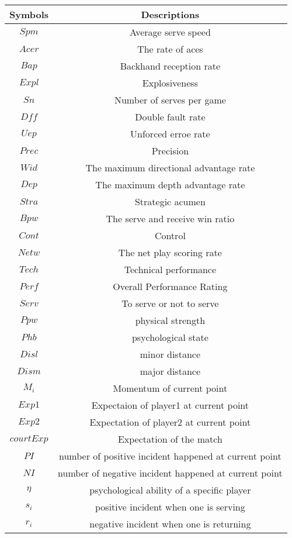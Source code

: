 \documentclass{article}
\begin{document}
\begin{table}[!]
    \centering
    \begin{tabular}{cc}
        \toprule
        Symbols & Descriptions\\
        \midrule
        $Spm$ & Average serve speed \\
        $Acer$ & The rate of aces \\
        $Bap$ & Backhand reception rate \\
        $Expl$ & Explosiveness \\
        $Sn$ & Number of serves per game\\
        $Dff$ & Double fault rate \\
        $Uep$ & Unforced erroe rate \\
        $Prec$ & Precision \\ 
        $Wid$ & The maximum directional advantage rate \\
        $Dep$ & The maximum depth advantage rate \\
        $Stra$ & Strategic acumen \\
        $Bpw$ & The serve and receive win ratio \\
        $Cont$ & Control \\
        $Netw$ & The net play scoring rate \\
        $Tech$ & Technical performance \\
        $Perf$ & Overall Performance Rating \\
        $Serv$ & To serve or not to serve \\
        $Ppw$ &physical strength \\
        $Phb$ & psychological state \\
        $Disl$ & minor distance \\
        $Dism$ & major distance\\
        $M_i$ &  Momentum of current point  \\
        $Exp1$ & Expectaion of player1 at current point \\
        $Exp2$ & Expectation of player2 at current point \\
            $courtExp$ & Expectation of the match\\
        $PI$ & number of positive incident happened at current point \\
        $NI$ & number of negative incident happened at current point \\
        $\eta$ & psychological ability of a specific player \\
        $s_i$ & positive incident when one is serving \\
        $r_i$ &  negative incident when one is returning \\
        \bottomrule
    \end{tabular}
    
    \end{table}
\end{document}

